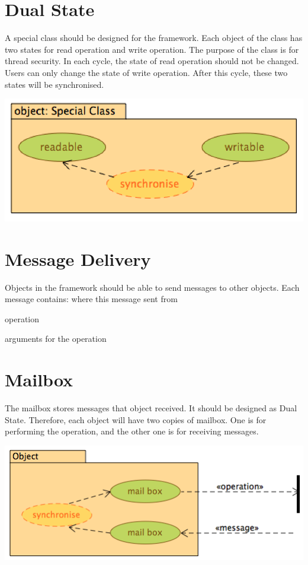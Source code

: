 \hypertarget{_functionalities_FunctionalitiesDualState}{}\section{Dual State}\label{_functionalities_FunctionalitiesDualState}
A special class should be designed for the framework. Each object of the class has two states for read operation and write operation. The purpose of the class is for thread security. In each cycle, the state of read operation should not be changed. Users can only change the state of write operation. After this cycle, these two states will be synchronised. 
\begin{DoxyImageNoCaption}
  \mbox{\includegraphics[width=\textwidth,height=\textheight/2,keepaspectratio=true]{FuncSpecDualState.png}}
\end{DoxyImageNoCaption}
\hypertarget{_functionalities_FunctionalitiesMessageDelivery}{}\section{Message Delivery}\label{_functionalities_FunctionalitiesMessageDelivery}
Objects in the framework should be able to send messages to other objects. Each message contains\+: where this message sent from
\begin{DoxyItemize}
\item operation
\item arguments for the operation
\end{DoxyItemize}\hypertarget{_functionalities_FunctionalitiesMailbox}{}\section{Mailbox}\label{_functionalities_FunctionalitiesMailbox}
The mailbox stores messages that object received. It should be designed as Dual State. Therefore, each object will have two copies of mailbox. One is for performing the operation, and the other one is for receiving messages. 
\begin{DoxyImageNoCaption}
  \mbox{\includegraphics[width=\textwidth,height=\textheight/2,keepaspectratio=true]{FuncSpecMailbox.png}}
\end{DoxyImageNoCaption}
 